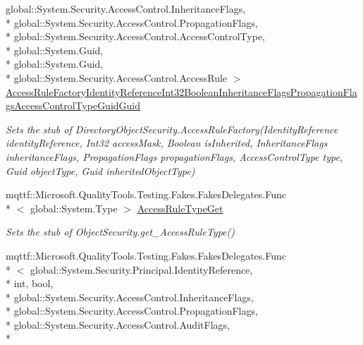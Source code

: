 \begin{DoxyCompactItemize}
global\-::\-System.\-Security.\-Access\-Control.\-Inheritance\-Flags, \\*
global\-::\-System.\-Security.\-Access\-Control.\-Propagation\-Flags, \\*
global\-::\-System.\-Security.\-Access\-Control.\-Access\-Control\-Type, \\*
global\-::\-System.\-Guid, \\*
global\-::\-System.\-Guid, \\*
global\-::\-System.\-Security.\-Access\-Control.\-Access\-Rule $>$ \hyperlink{class_system_1_1_security_1_1_access_control_1_1_fakes_1_1_stub_directory_object_security_ab7ad414acc0f6840d9716e7006240e7d}{Access\-Rule\-Factory\-Identity\-Reference\-Int32\-Boolean\-Inheritance\-Flags\-Propagation\-Flags\-Access\-Control\-Type\-Guid\-Guid}
\begin{DoxyCompactList}\small\item\em Sets the stub of Directory\-Object\-Security.\-Access\-Rule\-Factory(\-Identity\-Reference identity\-Reference, Int32 access\-Mask, Boolean is\-Inherited, Inheritance\-Flags inheritance\-Flags, Propagation\-Flags propagation\-Flags, Access\-Control\-Type type, Guid object\-Type, Guid inherited\-Object\-Type)\end{DoxyCompactList}\item 
mqttf\-::\-Microsoft.\-Quality\-Tools.\-Testing.\-Fakes.\-Fakes\-Delegates.\-Func\\*
$<$ global\-::\-System.\-Type $>$ \hyperlink{class_system_1_1_security_1_1_access_control_1_1_fakes_1_1_stub_directory_object_security_a543d769371a377b8231414e80262921c}{Access\-Rule\-Type\-Get}
\begin{DoxyCompactList}\small\item\em Sets the stub of Object\-Security.\-get\-\_\-\-Access\-Rule\-Type()\end{DoxyCompactList}\item 
mqttf\-::\-Microsoft.\-Quality\-Tools.\-Testing.\-Fakes.\-Fakes\-Delegates.\-Func\\*
$<$ global\-::\-System.\-Security.\-Principal.\-Identity\-Reference, \\*
int, bool, \\*
global\-::\-System.\-Security.\-Access\-Control.\-Inheritance\-Flags, \\*
global\-::\-System.\-Security.\-Access\-Control.\-Propagation\-Flags, \\*
global\-::\-System.\-Security.\-Access\-Control.\-Audit\-Flags, \\*

\end{DoxyCompactItemize}
